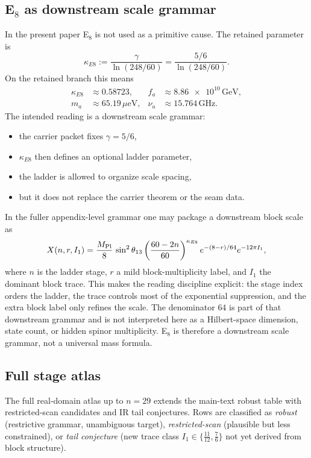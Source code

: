 \subsection{\texorpdfstring{E$_8$}{E8} as downstream scale grammar}

In the present paper E$_8$ is not used as a primitive cause. The retained parameter is
\[
\kappa_{E8}:=\frac{\gamma}{\ln(248/60)}=\frac{5/6}{\ln(248/60)}.
\]
On the retained branch this means
\[
\begin{aligned}
\kappa_{E8}&\approx \num{0.58723},
&
f_a&\approx \num{8.86e10}\,\mathrm{GeV},
\\
m_a&\approx \num{65.19}\,\mu\mathrm{eV},
&
\nu_a&\approx \num{15.764}\,\mathrm{GHz}.
\end{aligned}
\]
The intended reading is a downstream scale grammar:
\begin{itemize}[leftmargin=1.5em, topsep=3pt, itemsep=2pt]
    \item the carrier packet fixes $\gamma=5/6$,
    \item $\kappa_{E8}$ then defines an optional ladder parameter,
    \item the ladder is allowed to organize scale spacing,
    \item but it does not replace the carrier theorem or the seam data.
\end{itemize}
In the fuller appendix-level grammar one may package a downstream block scale as
\[
X(n,r,I_1)=\frac{M_{\mathrm{Pl}}}{8}\,\sin^2\theta_{13}
\left(\frac{60-2n}{60}\right)^{\kappa_{E8}}
e^{-(8-r)/64}e^{-12\pi I_1},
\]
where $n$ is the ladder stage, $r$ a mild block-multiplicity label, and $I_1$ the dominant block trace. This makes the reading discipline explicit: the stage index orders the ladder, the trace controls most of the exponential suppression, and the extra block label only refines the scale. The denominator $64$ is part of that downstream grammar and is not interpreted here as a Hilbert-space dimension, state count, or hidden spinor multiplicity. E$_8$ is therefore a downstream scale grammar, not a universal mass formula.

\subsection{Full stage atlas}

The full real-domain atlas up to $n=29$ extends the main-text robust table with restricted-scan candidates and IR tail conjectures. Rows are classified as \emph{robust} (restrictive grammar, unambiguous target), \emph{restricted-scan} (plausible but less constrained), or \emph{tail conjecture} (new trace class $I_1\in\{\frac{11}{12},\frac{7}{6}\}$ not yet derived from block structure).

